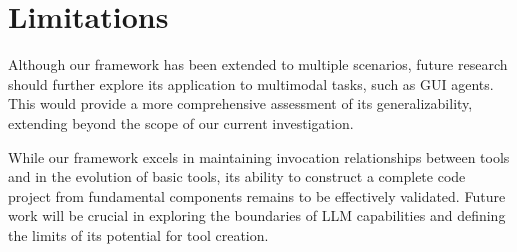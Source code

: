 \section{Limitations}
\label{sec:lim}
Although our framework has been extended to multiple scenarios, future research should further explore its application to multimodal tasks, such as GUI agents. This would provide a more comprehensive assessment of its generalizability, extending beyond the scope of our current investigation.

While our framework excels in maintaining invocation relationships between tools and in the evolution of basic tools, its ability to construct a complete code project from fundamental components remains to be effectively validated. Future work will be crucial in exploring the boundaries of LLM capabilities and defining the limits of its potential for tool creation.